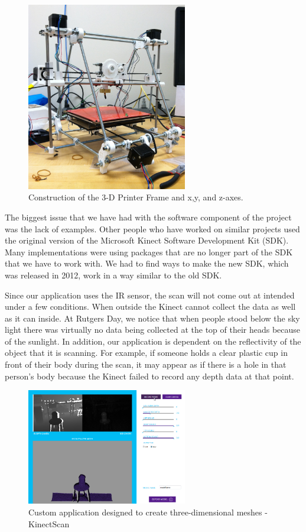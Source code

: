 \documentclass[pdftex,10.5pt]{report}
\begin{document}
\begin{figure}[H]
	\centering
	\includegraphics[width=70mm]{figures/photo.JPG}
	\caption{Construction of the 3-D Printer Frame and x,y, and z-axes.}
	\label{basebuilt}
\end{figure}

The biggest issue that we have had with the software component of the project was the lack of examples. Other people who have worked on similar projects used the original version of the Microsoft Kinect Software Development Kit (SDK). Many implementations were using packages that are no longer part of the SDK that we have to work with. We had to find ways to make the new SDK, which was released in 2012, work in a way similar to the old SDK. 

Since our application uses the IR sensor, the scan will not come out at intended under a few conditions. When outside the Kinect cannot collect the data as well as it can inside. At Rutgers Day, we notice that when people stood below the sky light there was virtually no data being collected at the top of their heads because of the sunlight. In addition, our application is dependent on the reflectivity of the object that it is scanning. For example, if someone holds a clear plastic cup in front of their body during the scan, it may appear as if there is a hole in that person's body because the Kinect failed to record any depth data at that point.

\begin{figure}[H]
	\centering
	\includegraphics[width=70mm]{figures/KinectScan.jpg}
	\caption{Custom application designed to create three-dimensional meshes - KinectScan}
	\label{kinectscan}
\end{figure}
\end{document}
